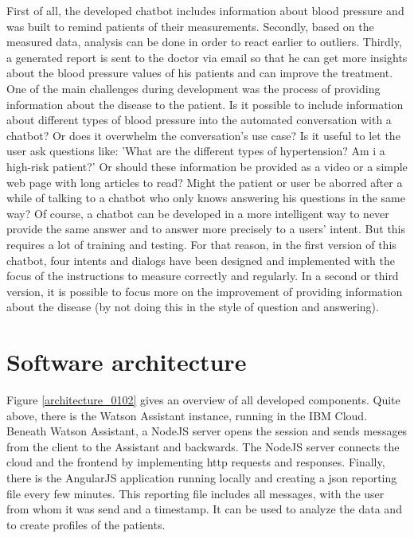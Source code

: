 First of all, the developed chatbot includes information about blood pressure and was built to remind patients of their measurements. Secondly, based on the measured data, analysis can be done in order to react earlier to outliers. Thirdly, a generated report is sent to the doctor via email so that he can get more insights about the blood pressure values of his patients and can improve the treatment.
One of the main challenges during development was the process of providing information about the disease to the patient. Is it possible to include information about different types of blood pressure into the automated conversation with a chatbot? Or does it overwhelm the conversation's use case? Is it useful to let the user ask questions like: 'What are the different types of hypertension? Am i a high-risk patient?' 
Or should these information be provided as a video or a simple web page with long articles to read? Might the patient or user be aborred after a while of talking to a chatbot who only knows answering his questions in the same way?
Of course, a chatbot can be developed in a more intelligent way to never provide the same answer and to answer more precisely to a users' intent. But this requires a lot of training and testing. 
For that reason, in the first version of this chatbot, four intents and dialogs have been designed and implemented with the focus of the instructions to measure correctly and regularly. 
In a second or third version, it is possible to focus more on the improvement of providing information about the disease (by not doing this in the style of question and answering).

\section{Software architecture}

Figure \ref{architecture_0102} gives an overview of all developed components. Quite above, there is the Watson Assistant instance, running in the IBM Cloud. Beneath Watson Assistant, a NodeJS server opens the session and sends messages from the client to the Assistant and backwards. The NodeJS server connects the cloud and the frontend by implementing \ac{http} requests and responses. Finally, there is the AngularJS application running locally and creating a \ac{json} reporting file every few minutes. This reporting file includes all messages, with the user from whom it was send and a timestamp. It can be used to analyze the data and to create profiles of the patients.

